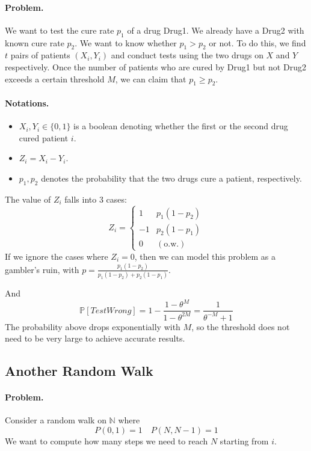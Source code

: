 \paragraph*{Problem.} We want to test the cure rate $p_1$ of a drug \textrm{Drug}1. We already have a \textrm{Drug}2 with known cure rate $p_2$. We want to know whether $p_1 > p_2$ or not. To do this, we find $t$ pairs of patients $(X_i, Y_i)$ and conduct tests using the two drugs on $X$ and $Y$ respectively. Once the number of patients who are cured by \textrm{Drug}1 but not \textrm{Drug}2 exceeds a certain threshold $M$, we can claim that $p_1 \ge p_2$.
\paragraph*{Notations.}
\begin{itemize}
    \item $X_i,Y_i \in \{0,1\}$ is a boolean denoting whether the first or the second drug cured patient $i$.
    \item $Z_i = X_i - Y_i$.
    \item $p_1, p_2$ denotes the probability that the two drugs cure a patient, respectively.
\end{itemize}

The value of $Z_i$ falls into 3 cases:
\[ Z_i = 
    \begin{cases}
        1 &p_1(1-p_2)\\
        -1 &p_2(1-p_1)\\
        0 &(\text{o.w.})
    \end{cases}
\]
If we ignore the cases where $Z_i = 0$, then we can model this problem as a gambler's ruin, with $p = \frac{p_1(1-p_2)}{p_1(1-p_2)+p_2(1-p_1)}$.

And
\[ \mathbb{P}[TestWrong] = 1 - \frac{1-\theta^M}{1-\theta^{2M}} = \frac{1}{\theta^{-M} + 1} \]
The probability above drops exponentially with $M$, so the threshold does not need to be very large to achieve accurate results.

\subsection{Another Random Walk}\label{AnotherRandWalk}
\paragraph*{Problem.} Consider a random walk on $\mathbb{N}$ where
\[ P(0,1) = 1 \quad P(N,N-1) = 1 \]
We want to compute how many steps we need to reach $N$ starting from $i$.
